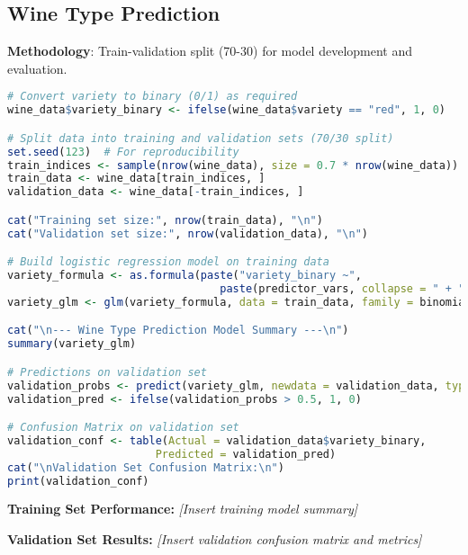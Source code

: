 \subsection{Wine Type Prediction}

\textbf{Methodology}: Train-validation split (70-30) for model development and evaluation.

\begin{lstlisting}[language=R, caption=Wine Type Prediction with Validation]
# Convert variety to binary (0/1) as required
wine_data$variety_binary <- ifelse(wine_data$variety == "red", 1, 0)

# Split data into training and validation sets (70/30 split)
set.seed(123)  # For reproducibility
train_indices <- sample(nrow(wine_data), size = 0.7 * nrow(wine_data))
train_data <- wine_data[train_indices, ]
validation_data <- wine_data[-train_indices, ]

cat("Training set size:", nrow(train_data), "\n")
cat("Validation set size:", nrow(validation_data), "\n")

# Build logistic regression model on training data
variety_formula <- as.formula(paste("variety_binary ~", 
                                 paste(predictor_vars, collapse = " + ")))
variety_glm <- glm(variety_formula, data = train_data, family = binomial)

cat("\n--- Wine Type Prediction Model Summary ---\n")
summary(variety_glm)

# Predictions on validation set
validation_probs <- predict(variety_glm, newdata = validation_data, type = "response")
validation_pred <- ifelse(validation_probs > 0.5, 1, 0)

# Confusion Matrix on validation set
validation_conf <- table(Actual = validation_data$variety_binary, 
                       Predicted = validation_pred)
cat("\nValidation Set Confusion Matrix:\n")
print(validation_conf)
\end{lstlisting}

\textbf{Training Set Performance:}
\textit{[Insert training model summary]}

\textbf{Validation Set Results:}
\textit{[Insert validation confusion matrix and metrics]}

